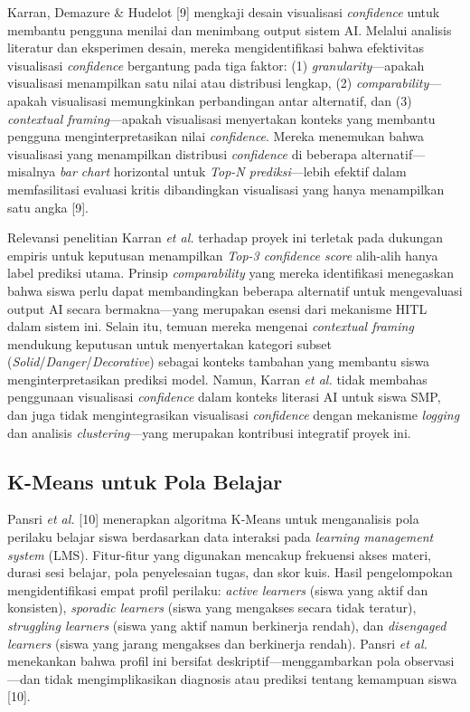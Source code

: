\documentclass[10pt,twoside,openright]{report}
\begin{document}
Karran, Demazure \& Hudelot [9] mengkaji desain visualisasi \textit{confidence} untuk membantu pengguna menilai dan menimbang output sistem AI. Melalui analisis literatur dan eksperimen desain, mereka mengidentifikasi bahwa efektivitas visualisasi \textit{confidence} bergantung pada tiga faktor: (1) \textit{granularity}—apakah visualisasi menampilkan satu nilai atau distribusi lengkap, (2) \textit{comparability}—apakah visualisasi memungkinkan perbandingan antar alternatif, dan (3) \textit{contextual framing}—apakah visualisasi menyertakan konteks yang membantu pengguna menginterpretasikan nilai \textit{confidence}. Mereka menemukan bahwa visualisasi yang menampilkan distribusi \textit{confidence} di beberapa alternatif—misalnya \textit{bar chart} horizontal untuk \textit{Top-N prediksi}—lebih efektif dalam memfasilitasi evaluasi kritis dibandingkan visualisasi yang hanya menampilkan satu angka [9].

Relevansi penelitian Karran \textit{et al.} terhadap proyek ini terletak pada dukungan empiris untuk keputusan menampilkan \textit{Top-3 confidence score} alih-alih hanya label prediksi utama. Prinsip \textit{comparability} yang mereka identifikasi menegaskan bahwa siswa perlu dapat membandingkan beberapa alternatif untuk mengevaluasi output AI secara bermakna—yang merupakan esensi dari mekanisme HITL dalam sistem ini. Selain itu, temuan mereka mengenai \textit{contextual framing} mendukung keputusan untuk menyertakan kategori subset (\textit{Solid}/\textit{Danger}/\textit{Decorative}) sebagai konteks tambahan yang membantu siswa menginterpretasikan prediksi model. Namun, Karran \textit{et al.} tidak membahas penggunaan visualisasi \textit{confidence} dalam konteks literasi AI untuk siswa SMP, dan juga tidak mengintegrasikan visualisasi \textit{confidence} dengan mekanisme \textit{logging} dan analisis \textit{clustering}—yang merupakan kontribusi integratif proyek ini.

\subsection{K-Means untuk Pola Belajar}
\label{subsec:penelitian-kmeans}

Pansri \textit{et al.} [10] menerapkan algoritma K-Means untuk menganalisis pola perilaku belajar siswa berdasarkan data interaksi pada \textit{learning management system} (LMS). Fitur-fitur yang digunakan mencakup frekuensi akses materi, durasi sesi belajar, pola penyelesaian tugas, dan skor kuis. Hasil pengelompokan mengidentifikasi empat profil perilaku: \textit{active learners} (siswa yang aktif dan konsisten), \textit{sporadic learners} (siswa yang mengakses secara tidak teratur), \textit{struggling learners} (siswa yang aktif namun berkinerja rendah), dan \textit{disengaged learners} (siswa yang jarang mengakses dan berkinerja rendah). Pansri \textit{et al.} menekankan bahwa profil ini bersifat deskriptif—menggambarkan pola observasi—dan tidak mengimplikasikan diagnosis atau prediksi tentang kemampuan siswa [10].
\end{document}
